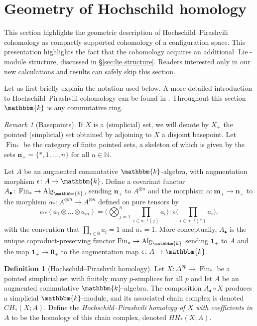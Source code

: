 \documentclass[12pt]{article}
\newcommand{\N}{\mathbb{N}}
\newcommand{\kk}{\mathbbm{k}}
\newcommand{\n}[1][n]{\mathbf{#1}}
\newcommand{\FinPointedSet}[1]{\n[#1]_{+}}
\DeclareMathOperator{\Fin}{Fin}
\DeclareMathOperator{\Lie}{Lie}
\theoremstyle{plain}
\theoremstyle{definition}
\newtheorem{defi}[thm]{Definition}
\theoremstyle{remark}
\newtheorem{rmk}[thm]{Remark}
\begin{document}
\section{Geometry of Hochschild homology}
\label{sec:hochschild}
This section highlights the geometric description of Hochschild--Pirashvili cohomology as compactly supported cohomology of a configuration space. This presentation highlights the fact that the cohomology acquires an additional $\Lie$-module structure, discussed in \S\ref{sec:lie structure}. Readers interested only in our new calculations and results can safely skip this section.

Let us first briefly explain the notation used below. A more detailed introduction to Hochschild--Pirashvili cohomology can be found in \cite{Pir00}.
Throughout this section $\kk$ is any commutative ring.

\begin{rmk}[Basepoints]
If $X$ is a (simplicial) set, we will denote by $X_{+}$ the pointed (simplicial) set obtained by adjoining to $X$ a disjoint basepoint. Let $\Fin_{\ast}$ be the category of finite pointed sets, a skeleton of which is given by the sets $\FinPointedSet{n} = \{\ast, 1,\ldots, n\}$ for all $n\in \N$.
\end{rmk}

Let $A$ be an augmented commutative $\kk$-algebra, with augmentation morphism $\epsilon\colon A\to\kk$. Define a covariant functor $A_{\bullet}\colon \Fin_{\ast}\to \operatorname{Alg}_{\kk}$, sending $\FinPointedSet{n}$ to $A^{\otimes n}$ and the morphism $\alpha\colon \FinPointedSet{m}\to \FinPointedSet{n}$ to the morphism $\alpha_{\ast}\colon A^{\otimes m}\to A^{\otimes n}$ defined on pure tensors by
\[
\alpha_{\ast}(a_1\otimes\ldots\otimes a_m) = \Big(\bigotimes_{j=1}^n{\prod_{i\in \alpha^{-1}(j)} a_i}\Big)\cdot \epsilon\Big(\prod_{i\in\alpha^{-1}(*)}{a_i}\Big),
\]
with the convention that $\prod_{i\in \emptyset}a_i = 1$ and $a_* = 1$. More conceptually, $A_{\bullet}$ is the unique coproduct-preserving functor $\Fin_{\ast}\to\operatorname{Alg}_{\kk}$ sending $\FinPointedSet{1}$ to $A$ and the map $\FinPointedSet{1}\to\FinPointedSet{0}$ to the augmentation map $\epsilon\colon A\to\kk$.

\begin{defi}[Hochschild--Pirashvili homology]\label{def:HP-homology}
    Let $X\colon \Delta^{op}\to \Fin_{\ast}$ be a pointed simplicial set with finitely many $p$-simplices for all $p$ and let $A$ be an augmented commutative $\kk$-algebra. The composition $A_{\bullet}\circ X$ produces a simplicial $\kk$-module, and its associated chain complex is denoted $CH_{\ast}(X; A)$. Define the \emph{Hochschild--Pirashvili homology of $X$ with coefficients in $A$} to be the homology of this chain complex, denoted $HH_{\ast}(X; A)$.
\end{defi}
\end{document}

